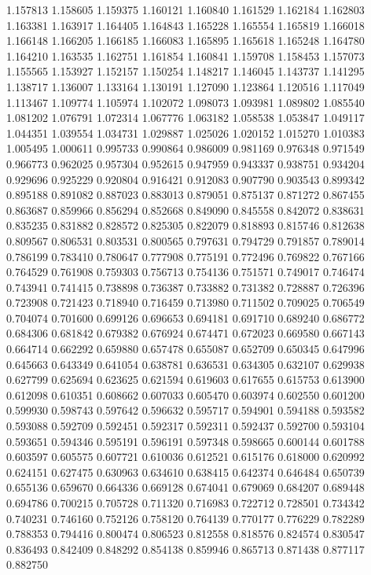 1.157813
1.158605
1.159375
1.160121
1.160840
1.161529
1.162184
1.162803
1.163381
1.163917
1.164405
1.164843
1.165228
1.165554
1.165819
1.166018
1.166148
1.166205
1.166185
1.166083
1.165895
1.165618
1.165248
1.164780
1.164210
1.163535
1.162751
1.161854
1.160841
1.159708
1.158453
1.157073
1.155565
1.153927
1.152157
1.150254
1.148217
1.146045
1.143737
1.141295
1.138717
1.136007
1.133164
1.130191
1.127090
1.123864
1.120516
1.117049
1.113467
1.109774
1.105974
1.102072
1.098073
1.093981
1.089802
1.085540
1.081202
1.076791
1.072314
1.067776
1.063182
1.058538
1.053847
1.049117
1.044351
1.039554
1.034731
1.029887
1.025026
1.020152
1.015270
1.010383
1.005495
1.000611
0.995733
0.990864
0.986009
0.981169
0.976348
0.971549
0.966773
0.962025
0.957304
0.952615
0.947959
0.943337
0.938751
0.934204
0.929696
0.925229
0.920804
0.916421
0.912083
0.907790
0.903543
0.899342
0.895188
0.891082
0.887023
0.883013
0.879051
0.875137
0.871272
0.867455
0.863687
0.859966
0.856294
0.852668
0.849090
0.845558
0.842072
0.838631
0.835235
0.831882
0.828572
0.825305
0.822079
0.818893
0.815746
0.812638
0.809567
0.806531
0.803531
0.800565
0.797631
0.794729
0.791857
0.789014
0.786199
0.783410
0.780647
0.777908
0.775191
0.772496
0.769822
0.767166
0.764529
0.761908
0.759303
0.756713
0.754136
0.751571
0.749017
0.746474
0.743941
0.741415
0.738898
0.736387
0.733882
0.731382
0.728887
0.726396
0.723908
0.721423
0.718940
0.716459
0.713980
0.711502
0.709025
0.706549
0.704074
0.701600
0.699126
0.696653
0.694181
0.691710
0.689240
0.686772
0.684306
0.681842
0.679382
0.676924
0.674471
0.672023
0.669580
0.667143
0.664714
0.662292
0.659880
0.657478
0.655087
0.652709
0.650345
0.647996
0.645663
0.643349
0.641054
0.638781
0.636531
0.634305
0.632107
0.629938
0.627799
0.625694
0.623625
0.621594
0.619603
0.617655
0.615753
0.613900
0.612098
0.610351
0.608662
0.607033
0.605470
0.603974
0.602550
0.601200
0.599930
0.598743
0.597642
0.596632
0.595717
0.594901
0.594188
0.593582
0.593088
0.592709
0.592451
0.592317
0.592311
0.592437
0.592700
0.593104
0.593651
0.594346
0.595191
0.596191
0.597348
0.598665
0.600144
0.601788
0.603597
0.605575
0.607721
0.610036
0.612521
0.615176
0.618000
0.620992
0.624151
0.627475
0.630963
0.634610
0.638415
0.642374
0.646484
0.650739
0.655136
0.659670
0.664336
0.669128
0.674041
0.679069
0.684207
0.689448
0.694786
0.700215
0.705728
0.711320
0.716983
0.722712
0.728501
0.734342
0.740231
0.746160
0.752126
0.758120
0.764139
0.770177
0.776229
0.782289
0.788353
0.794416
0.800474
0.806523
0.812558
0.818576
0.824574
0.830547
0.836493
0.842409
0.848292
0.854138
0.859946
0.865713
0.871438
0.877117
0.882750
